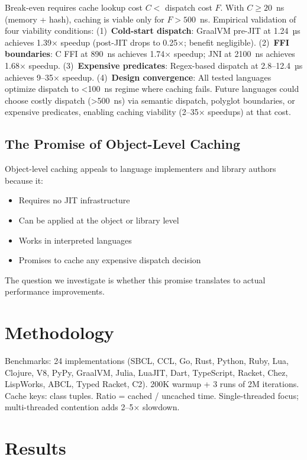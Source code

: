 \documentclass[sigplan,final,acmsmall,review,screen]{acmart}
\begin{document}
Break-even requires cache lookup cost $C < $ dispatch cost $F$. With $C \geq 20$~ns (memory + hash), caching is viable only for $F > 500$~ns. Empirical validation of four viability conditions: (1)~\textbf{Cold-start dispatch}: GraalVM pre-JIT at 1.24~µs achieves 1.39× speedup (post-JIT drops to 0.25×; benefit negligible). (2)~\textbf{FFI boundaries}: C FFI at 890~ns achieves 1.74× speedup; JNI at 2100~ns achieves 1.68× speedup. (3)~\textbf{Expensive predicates}: Regex-based dispatch at 2.8--12.4~µs achieves 9--35× speedup. (4)~\textbf{Design convergence}: All tested languages optimize dispatch to <100~ns regime where caching fails. Future languages could choose costly dispatch (>500~ns) via semantic dispatch, polyglot boundaries, or expensive predicates, enabling caching viability (2--35× speedups) at that cost.

\subsection{The Promise of Object-Level Caching}

Object-level caching appeals to language implementers and library authors because it:
\begin{itemize}
  \item Requires no JIT infrastructure
  \item Can be applied at the object or library level
  \item Works in interpreted languages
  \item Promises to cache any expensive dispatch decision
\end{itemize}

The question we investigate is whether this promise translates to actual performance improvements.

\section{Methodology}

Benchmarks: 24 implementations (SBCL, CCL, Go, Rust, Python, Ruby, Lua, Clojure, V8, PyPy, GraalVM, Julia, LuaJIT, Dart, TypeScript, Racket, Chez, LispWorks, ABCL, Typed Racket, C2). 200K warmup + 3 runs of 2M iterations. Cache keys: class tuples. Ratio = cached / uncached time. Single-threaded focus; multi-threaded contention adds 2--5× slowdown.

\section{Results}
\end{document}

